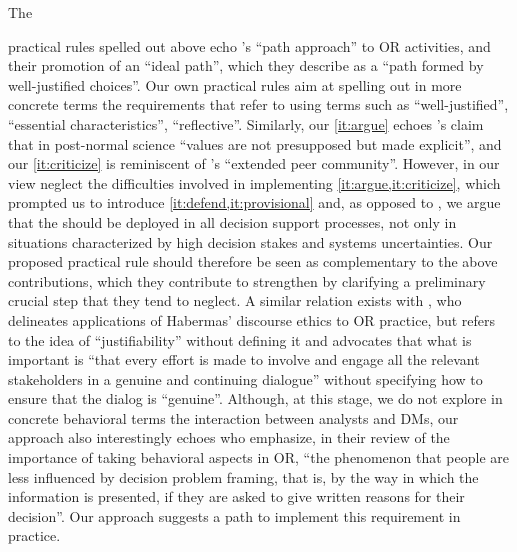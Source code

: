\documentclass[preprint, french, english, 11pt, authoryear]{elsarticle}%
\newcommand{\possessivecite}[1]{\citeauthor{#1}’s \citeyearpar{#1}}
\begin{document}
The \begin{changebar}practical rules spelled out above echo \possessivecite{lahtinen_why_2017} ``path approach'' to \ac{OR} activities, and their promotion of an ``ideal path'', which they describe as a ``path formed by well-justified choices''.
Our own practical rules aim at spelling out in more concrete terms the requirements that \citet{lahtinen_why_2017} refer to using terms such as ``well-justified'', ``essential characteristics'', ``reflective''.
Similarly, our \cref{it:argue} echoes \possessivecite{funtowicz_science_1993} claim that in post-normal science ``values are not presupposed but made explicit'', and our \cref{it:criticize} is reminiscent of \citeauthor{funtowicz_science_1993}’s ``extended peer community''.
However, in our view \citeauthor{funtowicz_science_1993} neglect the difficulties involved in implementing \cref{it:argue,it:criticize}, which prompted us to introduce \cref{it:defend,it:provisional} and, as opposed to \citeauthor{funtowicz_science_1993}, we argue that the  should be deployed in all decision support processes, 
not only in situations characterized by high decision stakes and systems uncertainties.
Our proposed practical rule should therefore be seen as complementary to the above contributions, which they contribute to strengthen by clarifying a preliminary crucial step that they tend to neglect.
A similar relation exists with \citet{mingers_ethics_2011}, who delineates applications of Habermas' discourse ethics to \ac{OR} practice, but refers to the idea of ``justifiability'' without defining it and 
advocates that what is important is ``that every effort is made to involve and engage all the relevant stakeholders in a genuine and continuing dialogue'' without specifying how to ensure that the dialog is ``genuine''.
Although, at this stage, we do not explore in concrete behavioral terms the interaction between analysts and \acp{DM}, 
our approach also interestingly echoes \citet{hamalainen_importance_2013} who emphasize, in their review of the importance of taking behavioral aspects in \ac{OR}, 
``the phenomenon that people are less influenced by decision problem framing, that is, by the way in which the information is presented, if they are asked to give written reasons for their decision''.
Our approach suggests a path to implement this requirement in practice.\end{changebar}
\end{document}
